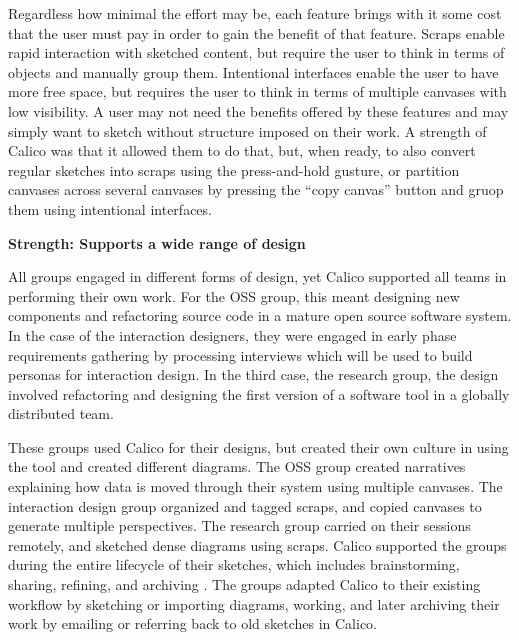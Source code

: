 Regardless how minimal the effort may be, each feature brings with it some cost that the user must pay in order to gain the benefit of that feature. Scraps enable rapid interaction with sketched content, but require the user to think in terms of objects and manually group them. Intentional interfaces enable the user to have more free space, but requires the user to think in terms of multiple canvases with low visibility. A user may not need the benefits offered by these features and may simply want to sketch without structure imposed on their work. A strength of Calico was that it allowed them to do that, but, when ready, to also convert regular sketches into scraps using the press-and-hold gusture, or partition canvases across several canvases by pressing the ``copy canvas'' button and gruop them using intentional interfaces.


\textbf{Strength: Supports a wide range of design}

All groups engaged in different forms of design, yet Calico supported all teams in performing their own work. For the OSS group, this meant designing new components and refactoring source code in a mature open source software system. In the case of the interaction designers, they were engaged in early phase requirements gathering by processing interviews which will be used to build personas for interaction design. In the third case, the research group, the design involved refactoring and designing the first version of a software tool in a globally distributed team. 

These groups used Calico for their designs, but created their own culture in using the tool and created different diagrams. The OSS group created narratives explaining how data is moved through their system using multiple canvases. The interaction design group organized and tagged scraps, and copied canvases to generate multiple perspectives. The research group carried on their sessions remotely, and sketched dense diagrams using scraps. Calico supported the groups during the entire lifecycle of their sketches, which includes brainstorming, sharing, refining, and archiving \citep{walny6069462}. The groups adapted Calico to their existing workflow by sketching or importing diagrams, working, and later archiving their work by emailing or referring back to old sketches in Calico.


